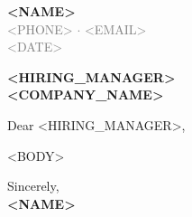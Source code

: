 \documentclass[11pt,a4paper]{article}
\begin{document}
\begin{center}
  {\LARGE \textbf{<NAME>}} \\[4pt]
  \textcolor{gray}{<PHONE> $\cdot$ <EMAIL>} \\[2pt]
  \small\textcolor{gray}{<DATE>}
\end{center}

\vspace{1em}
\noindent \textbf{<HIRING_MANAGER>} \\
\textbf{<COMPANY_NAME>}

\vspace{1.5em}

\noindent Dear <HIRING_MANAGER>,

\vspace{0.5em}

<BODY>

\vspace{1.5em}

\noindent Sincerely, \\[0.5em]
\textbf{<NAME>}
\end{document}

